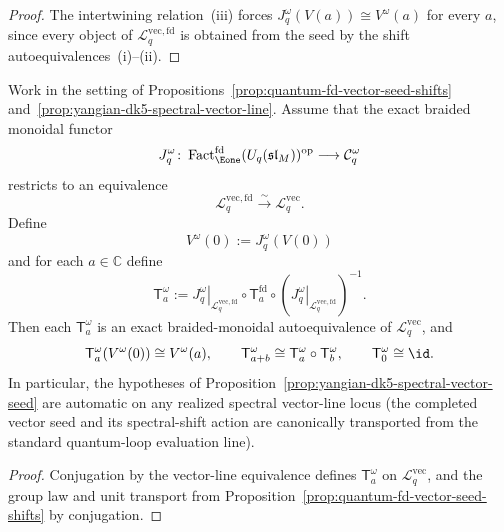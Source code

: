 \begin{proof}
The intertwining relation~\textup{(iii)} forces \(J_q^\omega(V(a))
\cong V^\omega(a)\) for every \(a\), since every object of
\(\mathcal{L}^{\mathrm{vec,fd}}_{q}\) is obtained from the seed by
the shift autoequivalences~\textup{(i)}--\textup{(ii)}.
\end{proof}

\begin{proposition}
\label{prop:yangian-dk5-spectral-seed-shift-construction}
Work in the setting of
Propositions~\ref{prop:quantum-fd-vector-seed-shifts}
and~\ref{prop:yangian-dk5-spectral-vector-line}.  Assume that the exact
braided monoidal functor
\[
J_q^\omega\colon
\operatorname{Fact}_{\Eone}^{\mathrm{fd}}(U_q(\mathfrak{sl}_M))^{\mathrm{op}}
\longrightarrow
\mathcal{C}_q^\omega
\]
restricts to an equivalence
\[
\mathcal{L}^{\mathrm{vec,fd}}_{q}\xrightarrow{\sim}
\mathcal{L}^{\mathrm{vec}}_{q}.
\]
Define
\[
V^\omega(0):=J_q^\omega(V(0))
\]
and for each \(a\in\mathbb{C}\) define
\[
\mathsf{T}^{\omega}_a
:=
\left.J_q^\omega\right|_{\mathcal{L}^{\mathrm{vec,fd}}_{q}}
\circ
\mathsf{T}^{\mathrm{fd}}_a
\circ
\left(\left.J_q^\omega\right|_{\mathcal{L}^{\mathrm{vec,fd}}_{q}}\right)^{-1}.
\]
Then each \(\mathsf{T}^{\omega}_a\) is an exact braided-monoidal
autoequivalence of \(\mathcal{L}^{\mathrm{vec}}_{q}\), and
\[
\mathsf{T}^{\omega}_a(V^\omega(0))\cong V^\omega(a),
\qquad
\mathsf{T}^{\omega}_{a+b}\cong
\mathsf{T}^{\omega}_a\circ \mathsf{T}^{\omega}_b,
\qquad
\mathsf{T}^{\omega}_0\cong \id .
\]
In particular, the hypotheses of
Proposition~\ref{prop:yangian-dk5-spectral-vector-seed} are automatic
on any realized spectral vector-line locus (the completed vector seed
and its spectral-shift action are canonically transported from the
standard quantum-loop evaluation line).
\end{proposition}

\begin{proof}
Conjugation by the vector-line equivalence defines
\(\mathsf{T}^{\omega}_a\) on \(\mathcal{L}^{\mathrm{vec}}_{q}\),
and the group law and unit transport from
Proposition~\ref{prop:quantum-fd-vector-seed-shifts} by conjugation.
\end{proof}


